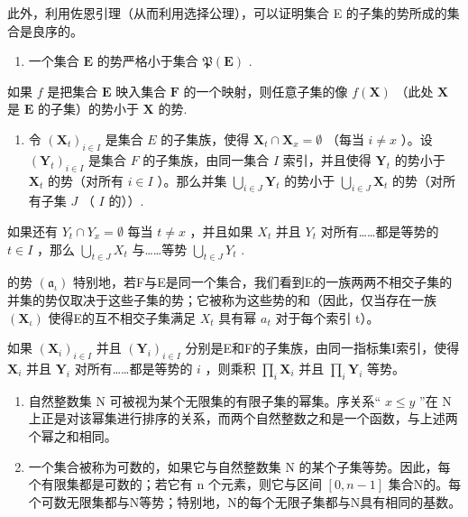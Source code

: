 此外，利用佐恩引理（从而利用选择公理），可以证明集合 E 的子集的势所成的集合是良序的。

\begin{enumerate}
\def\labelenumi{\arabic{enumi}.}
\setcounter{enumi}{3}
\tightlist
\item
  一个集合 \(\mathbf{E}\) 的势严格小于集合 \(\mathfrak{P}(\mathbf{E})\) .
\end{enumerate}

如果 \(f\) 是把集合 \(\mathbf{E}\) 映入集合 \(\mathbf{F}\) 的一个映射，则任意子集的像 \(f(\mathbf{X})\) （此处 \(\mathbf{X}\) 是 \(\mathbf{E}\) 的子集）的势小于 \(\mathbf{X}\) 的势.

\begin{enumerate}
\def\labelenumi{\arabic{enumi}.}
\setcounter{enumi}{4}
\tightlist
\item
  令 \((\mathbf{X}_t)_{i \in I}\) 是集合 \(E\) 的子集族，使得 \(\mathbf{X}_t \cap \mathbf{X}_x = \emptyset\) （每当 \(i \neq x\) ）。设 \((\mathbf{Y}_t)_{i \in I}\) 是集合 \(F\) 的子集族，由同一集合 \(I\) 索引，并且使得 \(\mathbf{Y}_t\) 的势小于 \(\mathbf{X}_t\) 的势（对所有 \(i \in I\) ）。那么并集 \(\bigcup_{i \in J} \mathbf{Y}_t\) 的势小于 \(\bigcup_{i \in J} \mathbf{X}_t\) 的势（对所有子集 \(J\) （ \(I\) 的））.
\end{enumerate}

如果还有 \(Y_{t} \cap Y_{x} = \emptyset\) 每当 \(t \neq x\) ，并且如果 \(X_{t}\) 并且 \(Y_{t}\) 对所有……都是等势的 \(t \in I\) ，那么 \(\bigcup_{t \in J} X_{t}\) 与……等势 \(\bigcup_{t \in J} Y_{t}\) .

的势 \((\mathfrak{a}_{\iota})\) 特别地，若F与E是同一个集合，我们看到E的一族两两不相交子集的并集的势仅取决于这些子集的势；它被称为这些势的和（因此，仅当存在一族 \((\mathbf{X}_{\iota})\) 使得E的互不相交子集满足 \(X_{t}\) 具有幂 \(a_{t}\) 对于每个索引 t）。

如果 \((\mathbf{X}_i)_{i\in I}\) 并且 \((\mathbf{Y}_i)_{i\in I}\) 分别是E和F的子集族，由同一指标集I索引，使得 \(\mathbf{X}_i\) 并且 \(\mathbf{Y}_i\) 对所有……都是等势的 \(i\) ，则乘积 \(\prod_{i}\mathbf{X}_{i}\) 并且 \(\prod_{i}\mathbf{Y}_{i}\) 等势。

\begin{enumerate}
\def\labelenumi{\arabic{enumi}.}
\setcounter{enumi}{5}
\item
  自然整数集 N 可被视为某个无限集的有限子集的幂集。序关系“ \(x \leqslant y\) ”在 N 上正是对该幂集进行排序的关系，而两个自然整数之和是一个函数，与上述两个幂之和相同。
\item
  一个集合被称为可数的，如果它与自然整数集 N 的某个子集等势。因此，每个有限集都是可数的；若它有 n 个元素，则它与区间 \([0, n - 1]\) 集合N的。每个可数无限集都与N等势；特别地，N的每个无限子集都与N具有相同的基数。
\end{enumerate}

